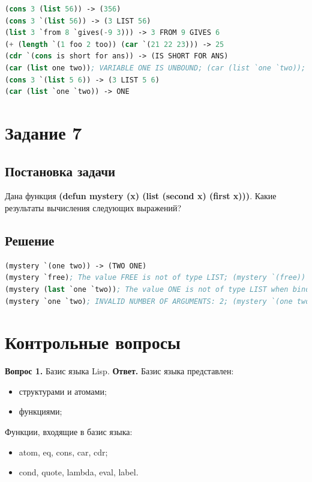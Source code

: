 \documentclass[12pt]{report}
\begin{document}
\begin{lstlisting}[label=6xd,caption=Решение задания №6, language=lisp]
(cons 3 (list 56)) -> (356)
(cons 3 `(list 56)) -> (3 LIST 56)
(list 3 `from 8 `gives(-9 3))) -> 3 FROM 9 GIVES 6
(+ (length `(1 foo 2 too)) (car `(21 22 23))) -> 25
(cdr `(cons is short for ans)) -> (IS SHORT FOR ANS)
(car (list one two)); VARIABLE ONE IS UNBOUND; (car (list `one `two)); -> ONE
(cons 3 `(list 5 6)) -> (3 LIST 5 6)
(car (list `one `two)) -> ONE
\end{lstlisting}

\section*{Задание 7}
\subsection*{Постановка задачи}
Дана функция \textbf{(defun mystery (x) (list (second x) (first x)))}. Какие результаты вычисления следующих выражений?

\subsection*{Решение}

\begin{lstlisting}[label=7xd,caption=Решение задания №7, language=lisp]
(mystery `(one two)) -> (TWO ONE)
(mystery `free); The value FREE is not of type LIST; (mystery `(free)) -> (NIL FREE)
(mystery (last `one `two)); The value ONE is not of type LIST when binding LIST; (mystery (last (`one `two))) -> (NIL TWO)
(mystery `one `two); INVALID NUMBER OF ARGUMENTS: 2; (mystery `(one two)) -> (TWO ONE)
\end{lstlisting}

	
\section*{Контрольные вопросы}

\textbf{Вопрос 1.} Базис языка Lisp. \newline
\indent\textbf{Ответ. }
Базис языка представлен:
\begin{itemize}
	\item структурами и атомами;
	\item функциями;
\end{itemize}

Функции, входящие в базис языка:
\begin{itemize}
	\item atom, eq, cons, car, cdr;
	\item cond, quote, lambda, eval, label.
\end{itemize}
\end{document}
